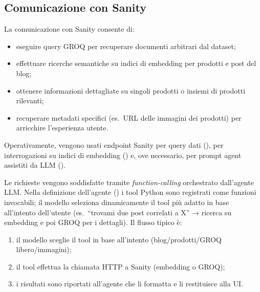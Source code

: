 \subsection{Comunicazione con Sanity}
La comunicazione con Sanity consente di:
\begin{itemize}
  \item eseguire query GROQ per recuperare documenti arbitrari dal dataset;
  \item effettuare ricerche semantiche su indici di embedding per prodotti e post del blog;
  \item ottenere informazioni dettagliate su singoli prodotti o insiemi di prodotti rilevanti;
  \item recuperare metadati specifici (es.\ URL delle immagini dei prodotti) per arricchire l’esperienza utente.
\end{itemize}

Operativamente, vengono usati endpoint Sanity per query dati (\texttt{}), per interrogazioni su indici di embedding (\texttt{}) e, ove necessario, per prompt agent assistiti da LLM (\texttt{}).

Le richieste vengono soddisfatte tramite \emph{function-calling} orchestrato dall’agente LLM. 
Nella definizione dell’agente (\texttt{}) i tool Python sono registrati come funzioni invocabili; 
il modello seleziona dinamicamente il tool più adatto in base all’intento dell’utente (es.\ “trovami due post correlati a X” → ricerca su embedding e poi GROQ per i dettagli). 
Il flusso tipico è:
\begin{enumerate}
  \item il modello sceglie il tool in base all’intento (blog/prodotti/GROQ libero/immagini);
  \item il tool effettua la chiamata HTTP a Sanity (embedding o GROQ);
  \item i risultati sono riportati all’agente che li formatta e li restituisce alla UI.
\end{enumerate}

